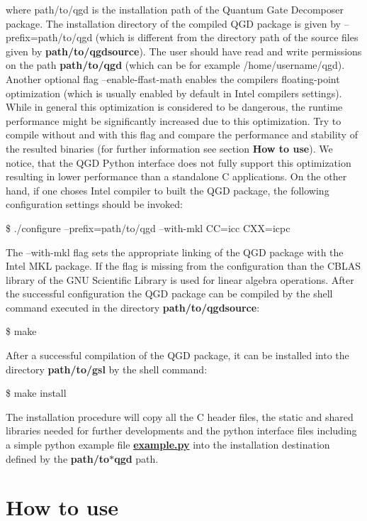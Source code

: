 where path/to/qgd is the installation path of the Quantum Gate Decomposer package. The installation directory of the compiled Q\+GD package is given by --prefix=path/to/qgd (which is different from the directory path of the source files given by {\bfseries path/to/qgdsource}). The user should have read and write permissions on the path {\bfseries path/to/qgd} (which can be for example /home/username/qgd). Another optional flag --enable-\/ffast-\/math enables the compiler\textquotesingle{}s floating-\/point optimization (which is usually enabled by default in Intel compilers settings). While in general this optimization is considered to be dangerous, the runtime performance might be significantly increased due to this optimization. Try to compile without and with this flag and compare the performance and stability of the resulted binaries (for further information see section {\bfseries How to use}). We notice, that the Q\+GD Python interface does not fully support this optimization resulting in lower performance than a standalone C applications. On the other hand, if one choses Intel compiler to built the Q\+GD package, the following configuration settings should be invoked\+:

\$ ./configure --prefix=path/to/qgd --with-\/mkl CC=icc C\+XX=icpc

The --with-\/mkl flag sets the appropriate linking of the Q\+GD package with the Intel M\+KL package. If the flag is missing from the configuration than the C\+B\+L\+AS library of the G\+NU Scientific Library is used for linear algebra operations. After the successful configuration the Q\+GD package can be compiled by the shell command executed in the directory {\bfseries path/to/qgdsource}\+:

\$ make

After a successful compilation of the Q\+GD package, it can be installed into the directory {\bfseries path/to/gsl} by the shell command\+:

\$ make install

The installation procedure will copy all the C header files, the static and shared libraries needed for further developments and the python interface files including a simple python example file {\bfseries \hyperlink{example_8py}{example.\+py}} into the installation destination defined by the {\bfseries path/to$\ast$qgd} path.

\section*{How to use}

